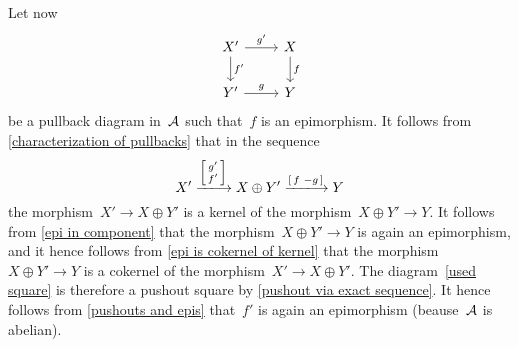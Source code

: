 Let now
\begin{equation}
  \label{used square}
  \begin{tikzcd}
      X'
      \arrow{r}[above]{g'}
      \arrow{d}[right]{f'}
    & X
      \arrow{d}[right]{f}
    \\
      Y'
      \arrow{r}[above]{g}
    & Y
  \end{tikzcd}
\end{equation}
be a pullback diagram in~$\mathcal{A}$ such that~$f$ is an epimorphism.
It follows from \cref{characterization of pullbacks} that in the sequence
\[
    X'
  \xlongto{ \begin{bsmallmatrix} g' \\ f' \end{bsmallmatrix} }
    X \oplus Y'
  \xlongto{ \begin{bsmallmatrix} f & -g \end{bsmallmatrix} }
    Y
\]
the morphism~$X' \to X \oplus Y'$ is a kernel of the morphism~$X \oplus Y' \to Y$.
It follows from \cref{epi in component} that the morphism~$X \oplus Y' \to Y$ is again an epimorphism, and it hence follows from \cref{epi is cokernel of kernel} that the morphism~$X \oplus Y' \to Y$ is a cokernel of the morphism~$X' \to X \oplus Y'$.
The diagram~\eqref{used square} is therefore a pushout square by \cref{pushout via exact sequence}.
It hence follows from \cref{pushouts and epis} that~$f'$ is again an epimorphism (beause~$\mathcal{A}$ is abelian).
